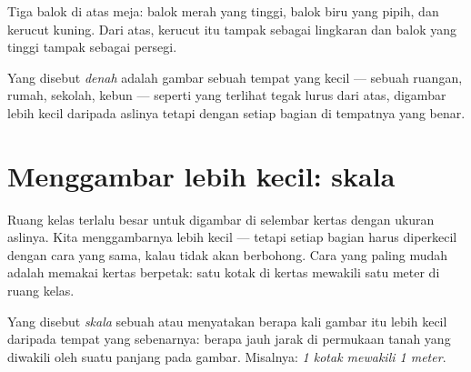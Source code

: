 \begin{omfigure}

{\small Tiga balok di atas meja: balok merah yang tinggi, balok biru yang
pipih, dan kerucut kuning. Dari atas, kerucut itu tampak sebagai lingkaran
dan balok yang tinggi tampak sebagai persegi.}
\label{fig:g2:drawing-to-map:blocks}
\end{omfigure}

\begin{definition}[Denah]\label{def:g2:drawing-to-map:plan}
Yang disebut \emph{denah} adalah gambar sebuah tempat yang
kecil --- sebuah ruangan, rumah, sekolah, kebun --- seperti yang terlihat
tegak lurus dari atas, digambar lebih kecil daripada aslinya tetapi dengan
setiap bagian di tempatnya yang benar.
\end{definition}

\section{Menggambar lebih kecil: skala}

Ruang kelas terlalu besar untuk digambar di selembar kertas dengan ukuran
aslinya. Kita menggambarnya lebih kecil --- tetapi setiap bagian harus
diperkecil dengan cara yang sama, kalau tidak  akan berbohong. Cara
yang paling mudah adalah memakai kertas berpetak: satu kotak di kertas
mewakili satu meter di ruang kelas.

\begin{definition}[Skala]\label{def:g2:drawing-to-map:scale}
Yang disebut \emph{skala} sebuah  atau  menyatakan
berapa kali gambar itu lebih kecil daripada tempat yang sebenarnya: berapa
jauh jarak di permukaan tanah yang diwakili oleh suatu panjang pada gambar.
Misalnya: \emph{1 kotak mewakili 1 meter}.
\end{definition}

